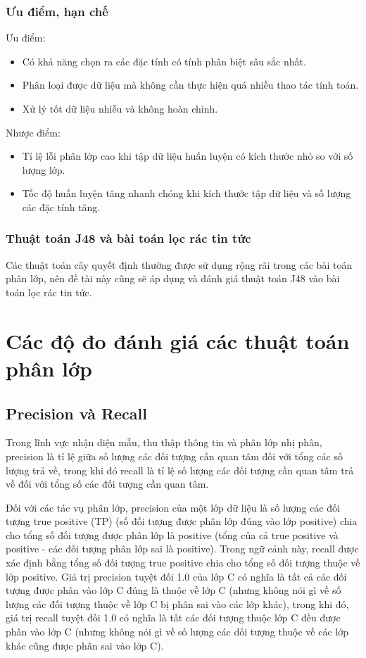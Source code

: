 \subsubsection{Ưu điểm, hạn chế}
Ưu điểm:
\begin{itemize}
  \item Có khả năng chọn ra các đặc tính có tính phân biệt sâu sắc nhất.
  \item Phân loại được dữ liệu mà không cần thực hiện quá nhiều thao tác tính toán.
  \item Xử lý tốt dữ liệu nhiễu và không hoàn chỉnh.
\end{itemize}
Nhược điểm:
\begin{itemize}
  \item Tỉ lệ lỗi phân lớp cao khi tập dữ liệu huấn luyện có kích thước nhỏ so với số lượng lớp.
  \item Tốc độ huấn luyện tăng nhanh chóng khi kích thước tập dữ liệu và số lượng các đặc tính tăng.
\end{itemize}
\subsubsection{Thuật toán J48 và bài toán lọc rác tin tức}
Các thuật toán cây quyết định thường được sử dụng rộng rãi trong các bài toán phân lớp, nên đề tài này cũng sẽ áp dụng và đánh giá thuật toán J48 vào bài toán lọc rác tin tức.
\section{Các độ đo đánh giá các thuật toán phân lớp}
\label{sec:eval}
\subsection{Precision và Recall}
Trong lĩnh vực nhận diện mẫu, thu thập thông tin và phân lớp nhị phân, precision là tỉ lệ giữa số lượng các đối tượng cần quan tâm đối với tổng các số lượng trả về, trong khi đó recall là tỉ lệ số lượng các đối tượng cần quan tâm trả về đối với tổng số các đối tượng cần quan tâm.

Đối với các tác vụ phân lớp, precision của một lớp dữ liệu là số lượng các đối tượng true positive (TP) (số đối tượng được phân lớp đúng vào lớp positive) chia cho tổng số đối tượng được phân lớp là positive (tổng của cả true positive và positive - các đối tượng phân lớp sai là positive). Trong ngữ cảnh này, recall được xác định bằng tổng số đối tượng true positive chia cho tổng số đối tượng thuộc về lớp positive. Giá trị precision tuyệt đối 1.0 của lớp C có nghĩa là tất cả các đối tượng được phân vào lớp C đúng là thuộc về lớp C (nhưng không nói gì về số lượng các đối tượng thuộc về lớp C bị phân sai vào các lớp khác), trong khi đó, giá trị recall tuyệt đối 1.0 có nghĩa là tất các đối tượng thuộc lớp C đều được phân vào lớp C (nhưng không nói gì về số lượng các dối tượng thuộc về các lớp khác cũng được phân sai vào lớp C).

